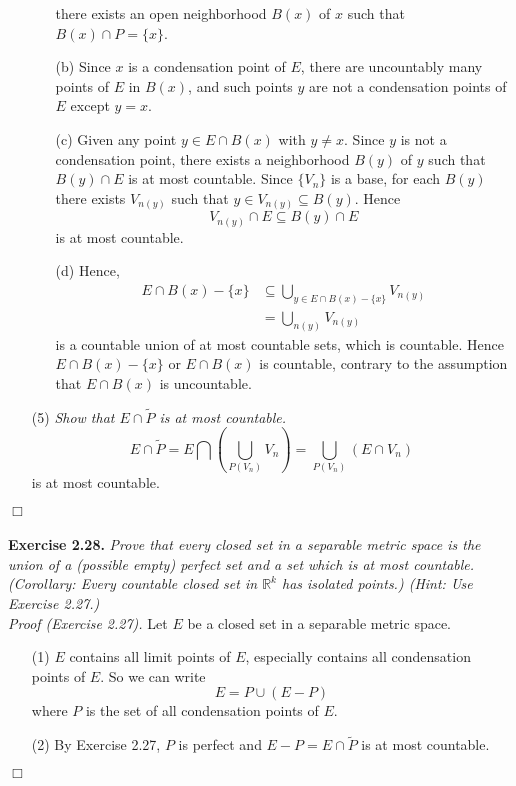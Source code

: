 \documentclass{article}
\begin{document}
\begin{enumerate}
\begin{enumerate}
  there exists an open neighborhood $B(x)$ of $x$ such that $B(x) \cap P = \{x\}$.
  \item[(b)]
  Since $x$ is a condensation point of $E$,
  there are uncountably many points of $E$ in $B(x)$,
  and such points $y$ are not a condensation points of $E$ except $y = x$.
  \item[(c)]
  Given any point $y \in E \cap B(x)$ with $y \neq x$.
  Since $y$ is not a condensation point,
  there exists a neighborhood $B(y)$ of $y$ such that $B(y) \cap E$ is at most countable.
  Since $\{V_n\}$ is a base,
  for each $B(y)$ there exists $V_{n(y)}$ such that $y \in V_{n(y)} \subseteq B(y)$.
  Hence $$V_{n(y)} \cap E \subseteq B(y) \cap E$$
  is at most countable.
  \item[(d)]
  Hence,
  \begin{align*}
  E \cap B(x) - \{x\}
  &\subseteq \bigcup_{y \in E \cap B(x) - \{x\}} V_{n(y)}  \\
  &= \bigcup_{n(y)} V_{n(y)}
  \end{align*}
  is a countable union of at most countable sets,
  which is countable.
  Hence $E \cap B(x) - \{x\}$ or $E \cap B(x)$ is countable,
  contrary to the assumption that $E \cap B(x)$ is uncountable.
  \end{enumerate}
\item[(5)]
\emph{Show that $E \cap \widetilde{P}$ is at most countable.}
$$E \cap \widetilde{P}
= E \bigcap \left(\bigcup_{P(V_n)} V_n\right)
= \bigcup_{P(V_n)}(E \cap V_n)$$
is at most countable.
\end{enumerate}

$\Box$ \\\\






\textbf{Exercise 2.28.}
\emph{Prove that every closed set in a separable metric space is
the union of a (possible empty) perfect set and a set which is at most
countable.
(Corollary: Every countable closed set in $\mathbb{R}^k$ has isolated points.)
(Hint: Use Exercise 2.27.) } \\

\emph{Proof (Exercise 2.27).}
Let $E$ be a closed set in a separable metric space.
\begin{enumerate}
\item[(1)]
$E$ contains all limit points of $E$,
especially contains all condensation points of $E$.
So we can write $$E = P \cup (E-P)$$
where $P$ is the set of all condensation points of $E$.
\item[(2)]
By Exercise 2.27, $P$ is perfect and
$E-P = E \cap \widetilde{P}$ is at most countable.
\end{enumerate}
$\Box$ \\
\end{document}
